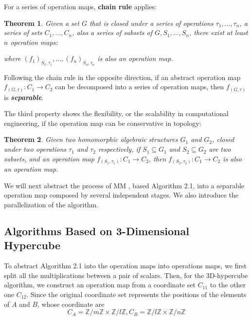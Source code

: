 \documentclass{amsart}
\newtheorem{theorem}{Theorem}[section]
\theoremstyle{definition}
\theoremstyle{remark}
\numberwithin{equation}{section}
\begin{document}
For a series of operation maps, \textbf{chain rule} applies:
\begin{theorem}
Given a set $G$ that is closed under a series of operations $\tau_1,...,\tau_n$, a series of sets $C_1,...,C_n$, also a series of subsets of $G, S_1,...,S_n$, there exist at least $n$ operation maps:


where $(f_1)_{S_1,\tau_1},...,(f_n)_{S_n,\tau_n}$ is also an operation map.
\end{theorem}

Following the chain rule in the opposite direction, if an abstract operation map $f_(G,\tau):C_1\to C_2$ can be decomposed into a series of operation maps, then $f_(G,\tau)$ is \emph{\textbf{separable}}.\par

The third property shows the flexibility, or the scalability in computational engineering, if the operation map can be conservative in topology:
\begin{theorem}
Given two homomorphic algebraic structures $G_1$ and $G_2$, closed under two operations $\tau_1$ and $\tau_2$ respectively, if $S_1\subseteq G_1$ and $S_2\subseteq G_2$ are two subsets, and an operation map $f_(S_1,\tau_1):C_1\to C_2$, then $f_(S_2,\tau_2):C_1\to C_2$ is also an operation map.
\end{theorem}
We will next abstract the process of MM , based Algorithm 2.1, into a separable operation map composed by several independent stages. We also introduce the parallelization of the algorithm.\\



\subsection{Algorithms Based on 3-Dimensional Hypercube}
	To abstract Algorithm 2.1 into the operation maps into operations maps, we first split all the multiplications between a pair of scalars. Then, for the 3D-hypercube algorithm, we construct an operation map from a coordinate set $C_{11}$ to the other one $C_{12}$. Since the original coordinate set represents the positions of the elements of $A$ and $B$, whose coordinate are
\begin{equation}
C_A=\mathbb{Z}/{m\mathbb{Z}}\times \mathbb{Z}/{l\mathbb{Z}},
C_B=\mathbb{Z}/{l\mathbb{Z}}\times \mathbb{Z}/{n\mathbb{Z}}
\end{equation}
\end{document}
